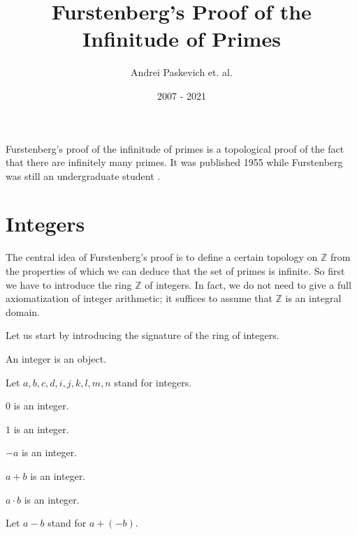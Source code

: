 \documentclass{article}
\title{Furstenberg's Proof of the Infinitude of Primes}
\author{Andrei Paskevich et. al.}
\date{2007 - 2021}
\newcommand{\Int}{\mathbb{Z}}
\begin{document}
  \maketitle

  Furstenberg's proof of the infinitude of primes is a topological proof of the fact that there are
  infinitely many primes. It was published 1955 while Furstenberg was still an undergraduate
  student \cite{Furstenberg1955}.

  \section{Integers}

  The central idea of Furstenberg's proof is to define a certain topology on $\Int$ from the
  properties of which we can deduce that the set of primes is infinite. So first we have to
  introduce the ring $\Int$ of integers. In fact, we do not need to give a full axiomatization of
  integer arithmetic; it suffices to assume that $\Int$ is an integral domain.

  Let us start by introducing the signature of the ring of integers.

  \begin{forthel}

    \begin{signature}\label{Integers}
      An integer is an object.
    \end{signature}

    Let $a,b,c,d,i,j,k,l,m,n$ stand for integers.

    \begin{signature}\label{IntZero}
      $0$ is an integer.
    \end{signature}

    \begin{signature}\label{IntOne}
      $1$ is an integer.
    \end{signature}

    \begin{signature}\label{IntNeg}
      $-a$ is an integer.
    \end{signature}

    \begin{signature}\label{IntPlus}
      $a + b$ is an integer.
    \end{signature}

    \begin{signature}\label{IntMult}
      $a \cdot b$ is an integer.
    \end{signature}

    Let $a - b$ stand for $a + (-b)$.
  \end{forthel}
\end{document}
